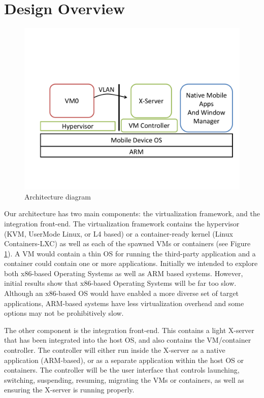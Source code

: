 \section{Design Overview}
\label{sec:overview}

\begin{figure}[tb]
\centering
\includegraphics[width=1.5\columnwidth]{arch}
\caption{Architecture diagram}
\label{fig:arch}
\end{figure}

\label{sec:proposedarch}
Our architecture has two main components: the virtualization framework, and the integration front-end.  The virtualization framework contains the hypervisor (KVM, UserMode Linux, or L4 based) or a container-ready kernel (Linux Containers-LXC) as well as each of the spawned VMs or containers (see Figure \ref{fig:arch}).  A VM would contain a thin OS for running the third-party application and a container could contain one or more applications.  Initially we intended to explore both x86-based Operating Systems as well as ARM based systems.  However, initial results show that x86-based Operating Systems will be far too slow.  Although an x86-based OS would have enabled a more diverse set of target applications, ARM-based systems have less virtualization overhead and some options may not be prohibitively slow. %

The other component is the integration front-end. This contains a light X-server that has been integrated into the host OS, and also contains the VM/container controller. The controller will either run inside the X-server as a native application (ARM-based), or as a separate application within the host OS or containers. The controller will be the user interface that controls launching, switching, suspending, resuming, migrating the VMs or containers, as well as ensuring the X-server is running properly. %


